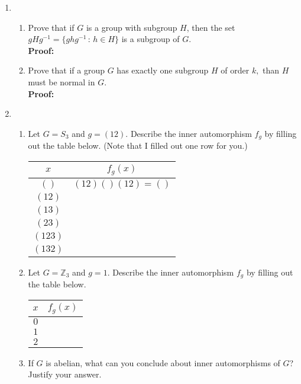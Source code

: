 \documentclass[12pt]{article}
\newcommand{\bbZ}{\mathbb{Z}}
\begin{document}
\begin{enumerate}
\item 
	\begin{enumerate}
	\item Prove that if $G$ is a group with subgroup $H$, then the set $gHg^{-1}=\{ghg^{-1} \, : \, h \in H\}$ is a subgroup of $G.$\\
	
	\textbf{Proof:}
	\vfill
	
	\item Prove that if a group $G$ has exactly one subgroup $H$ of order $k,$ than $H$ must be normal in $G.$\\
	
	\textbf{Proof:}
	\vfill
	\end{enumerate}
\newpage
\item 
	\begin{enumerate}
	\item Let $G=S_3$ and $g=(12).$ Describe the inner automorphism $f_g$ by filling out the table below. (Note that I filled out one row for you.)\\
	
	\begin{tabular}{c|c}
	$x$ & $f_g(x)$ \\
	\hline
	$()$ & $(12)()(12)=()$ \\
	$(12)$ & \\
	$(13)$ & \\
	$(23)$ & \\
	$(123)$ & \\
	$(132)$ & \\
	\end{tabular}
	
	\item Let $G=\bbZ_3$ and $g=1.$ Describe the inner automorphism $f_g$ by filling out the table below. \\
	
	\begin{tabular}{c|c}
	$x$ & $f_g(x)$ \\
	\hline
	$0$ & \\
	$1$ & \\
	$2$ & \\
	\end{tabular}
		
	\item If $G$ is abelian, what can you conclude about inner automorphisms of $G$? Justify your answer.\\
	

\end{enumerate}
\end{enumerate}
\end{document}
